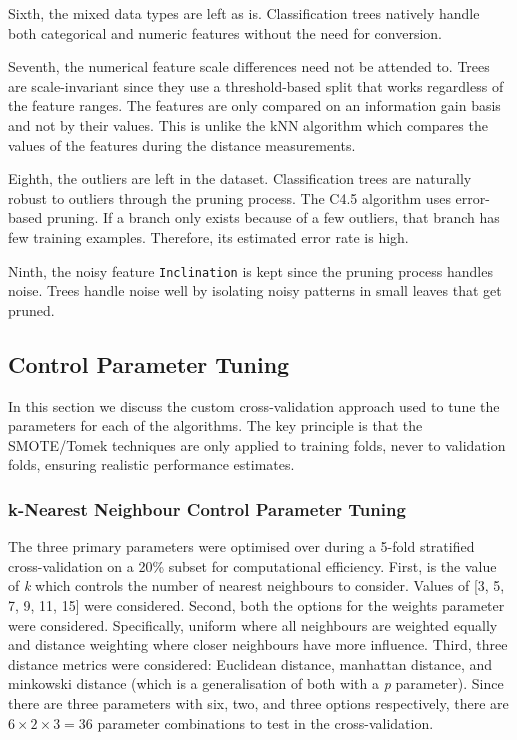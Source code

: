 \documentclass[10pt, conference]{IEEEtran}
\begin{document}
Sixth, the mixed data types are left as is. Classification trees natively handle both categorical and numeric features without the need for conversion.

Seventh, the numerical feature scale differences need not be attended to. Trees are scale-invariant since they use a threshold-based split that works regardless of the feature ranges. The features are only compared on an information gain basis and not by their values. This is unlike the kNN algorithm which compares the values of the features during the distance measurements.

Eighth, the outliers are left in the dataset. Classification trees are naturally robust to outliers through the pruning process. The C4.5 algorithm \cite{quinlan1993c45} uses error-based pruning. If a branch only exists because of a few outliers, that branch has few training examples. Therefore, its estimated error rate is high.

Ninth, the noisy feature \texttt{Inclination} is kept since the pruning process handles noise. Trees handle noise well by isolating noisy patterns in small leaves that get pruned.


\subsection{Control Parameter Tuning}
In this section we discuss the custom cross-validation approach used to tune the parameters for each of the algorithms. The key principle is that the SMOTE/Tomek techniques are only applied to training folds, never to validation folds, ensuring realistic performance estimates.
\subsubsection{k-Nearest Neighbour Control Parameter Tuning}
The three primary parameters were optimised over during a 5-fold stratified cross-validation on a 20\% subset for computational efficiency. First, is the value of \textit{k} which controls the number of nearest neighbours to consider. Values of [3, 5, 7, 9, 11, 15] were considered. Second, both the options for the weights parameter were considered. Specifically, uniform where all neighbours are weighted equally and distance weighting where closer neighbours have more influence. Third, three distance metrics were considered: Euclidean distance, manhattan distance, and minkowski distance (which is a generalisation of both with a \textit{p} parameter). Since there are three parameters with six, two, and three options respectively, there are $6 \times 2 \times 3 = 36$ parameter combinations to test in the cross-validation. 
	
\end{document}
